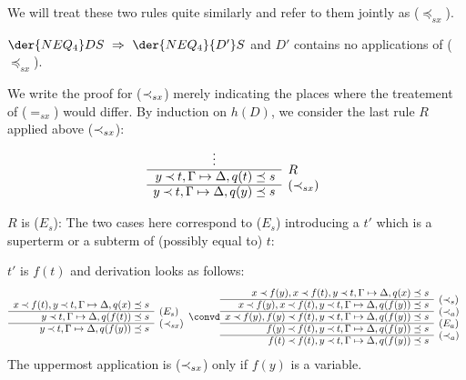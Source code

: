 We will treat these two rules quite similarly and refer to them jointly as ($\preceq_{sx}$).
\begin{LEMMA}\label{le:noInclsx}
 $\der{NEQ_4}DS\ \impl\ \der{NEQ_4}{D'}S$ and $D'$ contains no applications
 of ($\preceq_{sx}$).
\end{LEMMA}
\begin{PROOF}
We write the proof for ($\mathbin{\prec}_{sx}$) merely indicating the places where the
treatement of ($=_{sx}$) would differ.
By induction on $h(D)$, we consider the last rule $R$ applied above
($\mathbin{\prec}_{sx}$):
\[ \begin{array}{rl}
\multicolumn{1}{c}{\vdots} \\ \cline{1-1}
y\Incl t, \GSD, q(t)\preceq s & \rabove{R}\\ \cline{1-1}
y\Incl t, \GSD, q(y)\preceq s & \rabove{(\Incl_{sx})}
\end{array} \]
\begin{LS}
\item $R$ is ($E_s$):
The two cases here correspond to ($E_s$) introducing a $t'$ which is a superterm or a
subterm of (possibly equal to) $t$:
 \begin{LSA}
 \item $t'$ is $f(t)$ and derivation looks as follows:
\[ \begin{array}{rl}
  x\Incl f(t), y\Incl t, \GSD, q(x)\preceq s \\ \cline{1-1}
               y\Incl t, \GSD, q(f(t))\preceq s & \rabove{(E_s)} \\ \cline{1-1}
               y\Incl t, \GSD, q(f(y))\preceq s & \rabove{(\Incl_{sx})} 
\end{array} \convd
 \begin{array}{rl}
  x\Incl f(y), x\Incl f(t), y\Incl t, \GSD, q(x)\preceq s \\ \cline{1-1}
  x\Incl f(y), x\Incl f(t), y\Incl t, \GSD, q(f(y))\preceq s & \rabove{(\Incl_{s})}
  \\ \cline{1-1}
  x\Incl f(y), f(y)\Incl f(t), y\Incl t, \GSD, q(f(y))\preceq s & \rabove{(\Incl_a)}
  \\ \cline{1-1}
   f(y)\Incl f(t), y\Incl t, \GSD, q(f(y))\preceq s & \rabove{(E_a)} \\ \cline{1-1}
   f(t)\Incl f(t), y\Incl t, \GSD, q(f(y))\preceq s & \rabove{(\Incl_a)}
\end{array} \]
The uppermost application is ($\mathbin{\prec}_{sx}$) only if $f(y)$ is a variable. 

\end{LSA}
\end{LS}
\end{PROOF}
